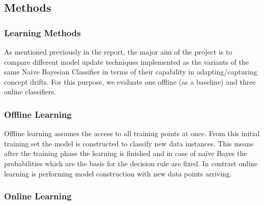 \documentclass{article} %
\begin{document}
\subsection{Methods}


\subsubsection{Learning Methods}

As mentioned previously in the report, the major aim of the project is to compare different model update techniques implemented as the variants of the same Naive Bayesian Classifier in terms of their capability in adapting/capturing concept drifts. For this purpose, we evaluate one offline (as a baseline) and three online classifiers.
\subsubsection{Offline Learning}
Offline learning assumes the access to all training points at once. From this initial training set the model is constructed to classify new data instances. This means after the training phase the learning is finished and in case of na\"ive Bayes  the probabilities which are the basis for the decision rule are fixed.  In contrast online learning is performing model construction with new data points arriving. 


\subsubsection{Online Learning}
\end{document}
